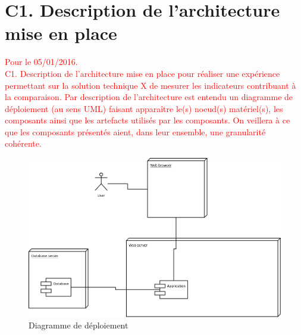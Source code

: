 \section{C1. Description de l’architecture mise en place}

\textcolor{red}{Pour le 05/01/2016.} \\

\textcolor{red}{C1. Description de l’architecture mise en place pour réaliser une expérience permettant sur la solution technique X de mesurer les indicateurs contribuant à la comparaison. Par description de l’architecture est entendu un diagramme de déploiement (au sens UML) faisant apparaître le(s) noeud(s) matériel(s), les composants ainsi que les artefacts utilisés par les composants. On veillera à ce que les composants présentés aient, dans leur ensemble, une granularité cohérente.}\\

	\begin{figure}[h!]
		\centering
		\includegraphics[width=18cm]{./images/diagDep.png}
		\caption{Diagramme de déploiement}
	\end{figure}
